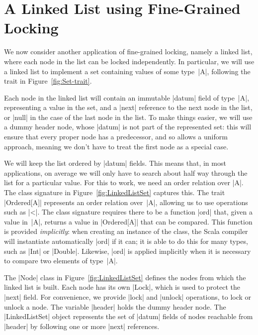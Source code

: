 \section{A Linked List using Fine-Grained Locking}

We now consider another application of fine-grained locking, namely a linked
list, where each node in the list can be locked independently.  In particular,
we will use a linked list to implement a set containing values of some
type~|A|, following the trait in Figure~\ref{fig:Set-trait}.

Each node in the linked list will contain an immutable |datum| field of
type~|A|, representing a value in the set, and a |next| reference to the next
node in the list, or |null| in the case of the last node in the list.  To make
things easier, we will use a dummy header node, whose |datum| is not part of
the represented set: this will ensure that every proper node has a
predecessor, and so allows a uniform approach, meaning we don't have to treat
the first node as a special case.

We will keep the list ordered by |datum| fields.  This means that, in most
applications, on average we will only have to search about half way through
the list for a particular value.  For this to work, we need an order relation
over |A|.  The class signature in Figure~\ref{fig:LinkedListSet} captures
this.  The trait |Ordered[A]| represents an order relation over~|A|, allowing
us to use operations such as |<|.  The class signature requires there to be a
function |ord| that, given a value in~|A|, returns a value in |Ordered[A]|
that can be compared.  This function is provided \emph{implicitly}: when
creating an instance of the class, the Scala compiler will instantiate
automatically |ord| if it can; it is able to do this for many types, such as
|Int| or |Double|.  Likewise, |ord| is applied implicitly when it is necessary
to compare two elements of type~|A|.

The |Node| class in Figure~\ref{fig:LinkedListSet} defines the nodes from
which the linked list is built.  Each node has its own |Lock|, which is used
to protect the |next| field.  For convenience, we provide |lock| and |unlock|
operations, to lock or unlock a node.  The variable |header| holds the dummy
header node. 
%
The |LinkedListSet| object represents the set of |datum| fields of nodes
reachable from |header| by following one or more |next| references.


